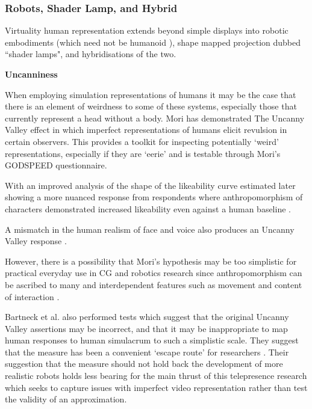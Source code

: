 \subsubsection{Robots, Shader Lamp, and Hybrid}
                Virtuality human representation extends beyond simple displays into robotic embodiments (which need not be humanoid \cite{Marti2005}), shape mapped projection dubbed ``shader lamps", and hybridisations of the two.\par 
                
				\textbf{Uncanniness}
				
When employing simulation representations of humans it may be the case that there is an element of weirdness to some of these systems, especially those that currently represent a head without a body. Mori has demonstrated The Uncanny Valley \cite{Mori1970} effect in which imperfect representations of humans elicit revulsion in certain observers. This provides a toolkit for inspecting potentially `weird' representations, especially if they are `eerie' and is testable through Mori's GODSPEED questionnaire. \par
                    With an improved analysis of the shape of the likeability curve estimated later showing a more nuanced response from respondents where anthropomorphism of characters demonstrated increased likeability even against a human baseline \cite{Bartneck2007, Bartneck2009}.\par
                    A mismatch in the human realism of face and voice also produces an Uncanny Valley response \cite{Mitchell2011}.\par
                    However, there is a possibility that Mori's hypothesis may be too simplistic for practical everyday use in CG and robotics research since anthropomorphism can be ascribed to many and interdependent features such as movement and content of interaction \cite{Bartneck2009}.\par
                    Bartneck et al. also performed tests which suggest that the original Uncanny Valley assertions may be incorrect, and that it may be inappropriate to map human responses to human simulacrum to such a simplistic scale. They suggest that the measure has been a convenient `escape route' for researchers \cite{Bartneck2009}. Their suggestion that the measure should not hold back the development of more realistic robots holds less bearing for the main thrust of this telepresence research which seeks to capture issues with imperfect video representation rather than test the validity of an approximation.\par
